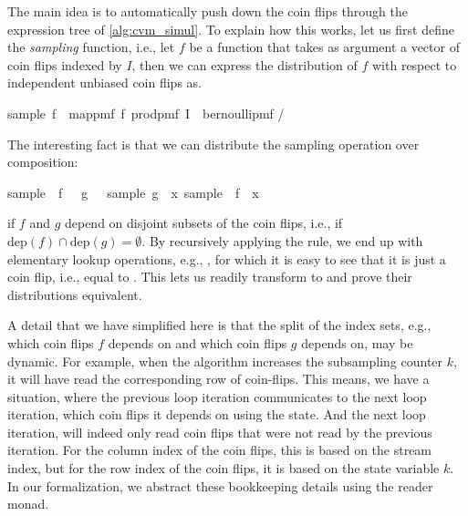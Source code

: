 The main idea is to automatically push down the coin flips through the expression tree of \cref{alg:cvm_simul}.
To explain how this works, let us first define the \emph{sampling} function, i.e., let $f$ be a function that takes as argument a vector of coin flips indexed by $I$, then we can express the distribution of $f$ with respect to independent unbiased coin flips as.
\begin{isabelle_cm}
  sample\ f\ \isacharequal\ map{\isacharunderscore}pmf\ f\ {\isacharparenleft}prod{\isacharunderscore}pmf\ I\ {\isacharparenleft}\isasymlambda\isacharunderscore\isachardot\ bernoulli{\isacharunderscore}pmf \isacharparenleft{}/\isacharparenright\isacharparenright\isacharparenright
\end{isabelle_cm}
The interesting fact is that we can distribute the sampling operation over composition:
\begin{isabelle_cm}
  sample\ \isacharparenleft\isasymlambda\isasymomega\isachardot\ f\ \isasymomega\ \isasymcirc\ g\ \isasymomega{\isacharparenright}\ \isacharequal\ sample\ g\ \isasymbind\ \isacharparenleft{\isasymlambda}x\isachardot\ sample\ \isacharparenleft\isasymlambda\isasymomega\isachardot\ f\ \isasymomega\isachardot\ x\isacharparenright\isacharparenright
\end{isabelle_cm}
if $f$ and $g$ depend on disjoint subsets of the coin flips, i.e., if $\mathrm{dep}(f) \cap \mathrm{dep}(g) = \emptyset$.
By recursively applying the rule, we end up with elementary lookup operations, e.g., , for which it is easy to see that it is just a coin flip, i.e., equal to .
This lets us readily transform  to  and prove their distributions equivalent.

A detail that we have simplified here is that the split of the index sets, e.g., which coin flips $f$ depends on and which coin flips $g$ depends on, may be dynamic.
For example, when the algorithm increases the subsampling counter $k$, it will have read the corresponding row of coin-flips.
This means, we have a situation, where the previous loop iteration communicates to the next loop iteration, which coin flips it depends on using the state.
And the next loop iteration, will indeed only read coin flips that were not read by the previous iteration.
For the column index of the coin flips, this is based on the stream index, but for the row index of the coin flips, it is based on the state variable $k$.
In our formalization, we abstract these bookkeeping details using the reader monad.

